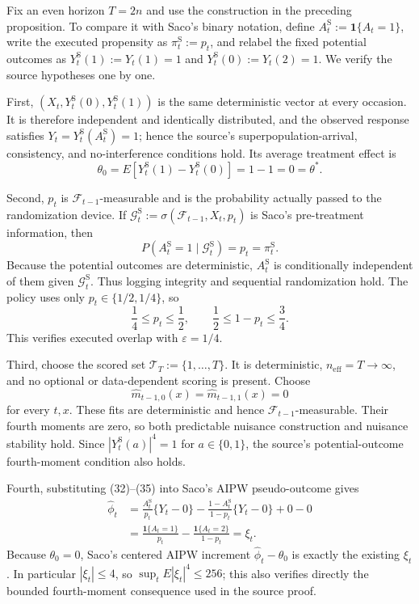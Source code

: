 Fix an even horizon \(T=2n\) and use the construction in the preceding proposition. To compare it with Saco's binary notation, define \(A_t^{\mathrm S}:=\mathbf1\{A_t=1\}\), write the executed propensity as \(\pi_t^{\mathrm S}:=p_t\), and relabel the fixed potential outcomes as \(Y_t^{\mathrm S}(1):=Y_t(1)=1\) and \(Y_t^{\mathrm S}(0):=Y_t(2)=1\). We verify the source hypotheses one by one.

First, \((X_t,Y_t^{\mathrm S}(0),Y_t^{\mathrm S}(1))\) is the same deterministic vector at every occasion. It is therefore independent and identically distributed, and the observed response satisfies \(Y_t=Y_t^{\mathrm S}(A_t^{\mathrm S})=1\); hence the source's superpopulation-arrival, consistency, and no-interference conditions hold. Its average treatment effect is
\[
 \theta_0=E[Y_t^{\mathrm S}(1)-Y_t^{\mathrm S}(0)]=1-1=0=\theta^*.
\tag{32}
\]

Second, \(p_t\) is \(\mathcal F_{t-1}\)-measurable and is the probability actually passed to the randomization device. If \(\mathcal G_t^{\mathrm S}:=\sigma(\mathcal F_{t-1},X_t,p_t)\) is Saco's pre-treatment information, then
\[
 P(A_t^{\mathrm S}=1\mid\mathcal G_t^{\mathrm S})=p_t=\pi_t^{\mathrm S}.
\tag{33}
\]
Because the potential outcomes are deterministic, \(A_t^{\mathrm S}\) is conditionally independent of them given \(\mathcal G_t^{\mathrm S}\). Thus logging integrity and sequential randomization hold. The policy uses only \(p_t\in\{1/2,1/4\}\), so
\[
 \frac14\le p_t\le\frac12,\qquad
 \frac12\le1-p_t\le\frac34.
\tag{34}
\]
This verifies executed overlap with \(\varepsilon=1/4\).

Third, choose the scored set \(\mathcal T_T:=\{1,\ldots,T\}\). It is deterministic, \(n_{\mathrm{eff}}=T\to\infty\), and no optional or data-dependent scoring is present. Choose
\[
 \widehat m_{t-1,0}(x)=\widehat m_{t-1,1}(x)=0
\tag{35}
\]
for every \(t,x\). These fits are deterministic and hence \(\mathcal F_{t-1}\)-measurable. Their fourth moments are zero, so both predictable nuisance construction and nuisance stability hold. Since \(|Y_t^{\mathrm S}(a)|^4=1\) for \(a\in\{0,1\}\), the source's potential-outcome fourth-moment condition also holds.

Fourth, substituting (32)--(35) into Saco's AIPW pseudo-outcome gives
\[
 \begin{aligned}
 \widehat\phi_t
 &=\frac{A_t^{\mathrm S}}{p_t}\{Y_t-0\}
   -\frac{1-A_t^{\mathrm S}}{1-p_t}\{Y_t-0\}+0-0\\
 &=\frac{\mathbf1\{A_t=1\}}{p_t}
   -\frac{\mathbf1\{A_t=2\}}{1-p_t}
 =\xi_t.
 \end{aligned}
\tag{36}
\]
Because \(\theta_0=0\), Saco's centered AIPW increment \(\widehat\phi_t-\theta_0\) is exactly the existing \(\xi_t\). In particular \(|\xi_t|\le4\), so \(\sup_tE|\xi_t|^4\le256\); this also verifies directly the bounded fourth-moment consequence used in the source proof.

